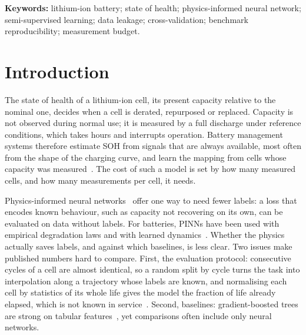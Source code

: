 \documentclass[11pt,a4paper]{article}
\begin{document}
\noindent\textbf{Keywords:} lithium-ion battery; state of health; physics-informed neural network; semi-supervised
learning; data leakage; cross-validation; benchmark reproducibility; measurement budget.

\section{Introduction}

The state of health of a lithium-ion cell, its present capacity relative to the nominal one, decides when a cell is
derated, repurposed or replaced. Capacity is not observed during normal use; it is measured by a full discharge under
reference conditions, which takes hours and interrupts operation. Battery management systems therefore estimate SOH
from signals that are always available, most often from the shape of the charging curve, and learn the mapping from
cells whose capacity was measured~\citep{roman2021,hu2020joule,sulzer2021}. The cost of such a model is set by how many
measured cells, and how many measurements per cell, it needs.

Physics-informed neural networks~\citep{raissi2019,karniadakis2021} offer one way to need fewer labels: a loss that
encodes known behaviour, such as capacity not recovering on its own, can be evaluated on data without labels. For
batteries, PINNs have been used with empirical degradation laws and with learned dynamics~\citep{wang2024,wen2023,navidi2024}.
Whether the physics actually saves labels, and against which baselines, is less clear. Two issues make published
numbers hard to compare. First, the evaluation protocol: consecutive cycles of a cell are almost identical, so a random
split by cycle turns the task into interpolation along a trajectory whose labels are known, and normalising each cell
by statistics of its whole life gives the model the fraction of life already elapsed, which is not known in
service~\citep{kapoor2023}. Second, baselines: gradient-boosted trees are strong on tabular features~\citep{grinsztajn2022},
yet comparisons often include only neural networks.
\end{document}
